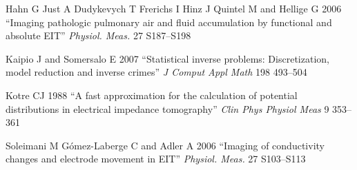 \documentclass[letterpaper,twocolumn,10pt]{article}
\begin{document}
\begin{list}{}
\item[]
Hahn G Just A Dudykevych T Frerichs I Hinz J Quintel M and Hellige G
2006
``Imaging pathologic pulmonary air and fluid accumulation by functional and absolute EIT''
{\em Physiol. Meas.}
27 S187--S198

\item[]
Kaipio J and Somersalo E 2007
``Statistical inverse problems: Discretization, model reduction and inverse crimes''
{\em J Comput Appl Math}
198 493--504

\item[]
Kotre CJ 1988
``A fast approximation for the calculation of potential distributions in electrical impedance tomography''
{\em Clin Phys Physiol Meas}
9 353--361

\item[]
Soleimani M G\'omez-Laberge C and Adler A 2006
``Imaging of conductivity changes and electrode movement in EIT''
{\em Physiol. Meas.} 27 S103--S113

\end{list}
\end{document}
